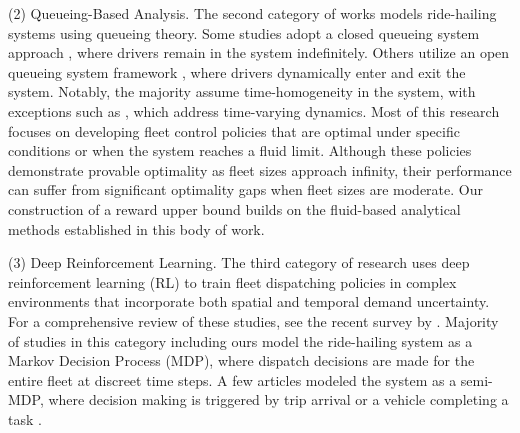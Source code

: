 \medskip 
\noindent(2) Queueing-Based Analysis. The second category of works models ride-hailing systems using queueing theory. Some studies adopt a closed queueing system approach \citep{banerjee2018, braverman2019empty, zhang2018modeling, waserhole2012vehicle, afeche2023}, where drivers remain in the system indefinitely. Others utilize an open queueing system framework \citep{varma2023electric, dong2022dynamic, wang2022, ozkan2020joint, ozkan2020dynamic, xu2021generalized}, where drivers dynamically enter and exit the system. Notably, the majority assume time-homogeneity in the system, with exceptions such as \cite{ozkan2020joint, ozkan2020dynamic, afeche2023, xu2021generalized}, which address time-varying dynamics. Most of this research focuses on developing fleet control policies that are optimal under specific conditions or when the system reaches a fluid limit. Although these policies demonstrate provable optimality as fleet sizes approach infinity, their performance can suffer from significant optimality gaps when fleet sizes are moderate. Our construction of a reward upper bound builds on the fluid-based analytical methods established in this body of work.



\medskip 
\noindent(3) Deep Reinforcement Learning. The third category of research uses deep reinforcement learning (RL) to train fleet dispatching policies in complex environments that incorporate both spatial and temporal demand uncertainty. For a comprehensive review of these studies, see the recent survey by \cite{qin2022reinforcement}. Majority of studies in this category including ours model the ride-hailing system as a Markov Decision Process (MDP), where dispatch decisions are made for the entire fleet at discreet time steps. A few articles modeled the system as a semi-MDP, where decision making is triggered by trip arrival or a vehicle completing a task \citep{kullman2022, singh2024dispatching, heitmann2023combining, gao2024stochastic}. 

